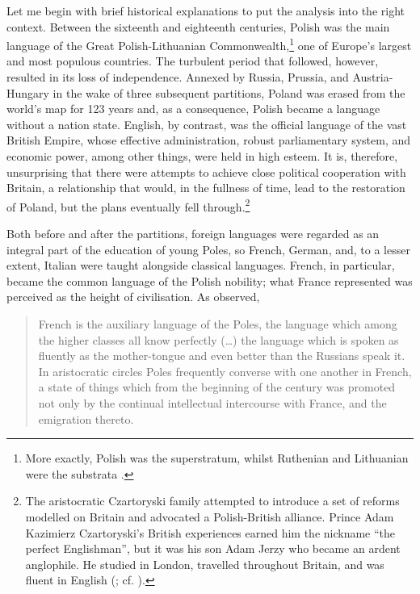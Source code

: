 \documentclass[output=paper,colorlinks,citecolor=brown,arabicfont,chinesefont]{langscibook}
\begin{document}
Let me begin with brief historical explanations to put the analysis into the right context. Between the sixteenth and eighteenth centuries, Polish was the main language of the Great Polish-Lithuanian Commonwealth,\footnote{More exactly, Polish was the superstratum, whilst Ruthenian and Lithuanian were the substrata \citep[280--281]{Walczak_bogdan2018}.} one of Europe’s largest and most populous countries. The turbulent period that followed, however, resulted in its loss of independence. Annexed by Russia, Prussia, and Austria\hyp Hungary in the wake of three subsequent partitions, Poland was erased from the world’s map for 123 years and, as a consequence, Polish became a language without a nation state. English, by contrast, was the official language of the vast British Empire, whose effective administration, robust parliamentary system, and economic power, among other things, were held in high esteem. It is, therefore, unsurprising that there were attempts to achieve close political cooperation with Britain, a relationship that would, in the fullness of time, lead to the restoration of Poland, but the plans eventually fell through.\footnote{The aristocratic Czartoryski family attempted to introduce a set of reforms modelled on Britain and advocated a Polish-British alliance. Prince Adam Kazimierz Czartoryski’s British experiences earned him the nickname “the perfect Englishman”, but it was his son Adam Jerzy who became an ardent anglophile. He studied in London, travelled throughout Britain, and was fluent in English (\citealt[18--19, 28]{Liponski_wojciech1978}; cf. \citealt{Konopczynski_wladyslaw1947}).}

Both before and after the partitions, foreign languages were regarded as an integral part of the education of young Poles, so French, German, and, to a lesser extent, Italian were taught alongside classical languages. French, in particular, became the common language of the Polish nobility; what France represented was perceived as the height of civilisation. As \citet[31]{Brandes_george1903} observed,

\begin{quote}
    French is the auxiliary language of the Poles, the language which among the higher classes all know perfectly (…) the language which is spoken as fluently as the mother-tongue and even better than the Russians speak it. In aristocratic circles Poles frequently converse with one another in French, a state of things which from the beginning of the century was promoted not only by the continual intellectual intercourse with France, and the emigration thereto.
\end{quote}
\end{document}
